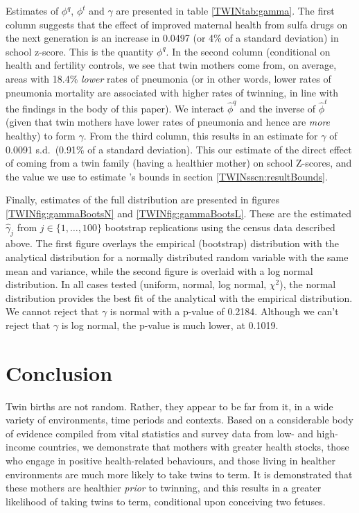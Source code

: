 \documentclass[subeqn]{article}
\begin{document}
\begin{spacing}{1.4}
Estimates of $\phi^q$, $\phi^t$ and $\gamma$ are presented in table
\ref{TWINtab:gamma}.  The first column suggests that the effect of improved
maternal health from sulfa drugs on the next generation is an increase
in 0.0497 (or 4\% of a standard deviation) in school z-score.  This is the
quantity $\phi^q$.  In the second column (conditional on health and fertility
controls, we see that twin mothers come from, on average, areas with 18.4\%
\emph{lower} rates of pneumonia (or in other words, lower rates of pneumonia
mortality are associated with higher rates of twinning, in line with the
findings in the body of this paper).  We interact $\hat\phi^q$ and the inverse
of $\hat\phi^t$ (given that twin mothers have lower rates of pneumonia and
hence are \emph{more} healthy) to form $\gamma$.  From the third column, this
results in an estimate for $\gamma$ of 0.0091 s.d.\ (0.91\% of a standard
deviation).  This our estimate of the direct effect of coming from a twin
family (having a healthier mother) on school Z-scores, and the value we use
to estimate \citet{Conleyetal2012}'s bounds in section
\ref{TWINsscn:resultBounds}.

Finally, estimates of the full distribution are presented in figures
\ref{TWINfig:gammaBootsN} and \ref{TWINfig:gammaBootsL}.  These are
the estimated $\hat\gamma_j$ from $j \in \{1,\ldots,100\}$ bootstrap
replications using the census data described above.  The first figure
overlays the empirical (bootstrap) distribution with the analytical
distribution for a normally distributed random variable with the same mean
and variance, while the second figure is overlaid with a log normal
distribution.  In all cases tested (uniform, normal, log normal, $\chi^2$),
the normal distribution provides the best fit of the analytical with the
empirical distribution. We cannot reject that $\gamma$ is normal with a
p-value of 0.2184.  Although we can't reject that $\gamma$ is log normal,
the p-value is much lower, at 0.1019.



\section{Conclusion}                               \label{TWINscn:conclusion}
Twin births are not random.  Rather, they appear to be far from it, in a wide
variety of environments, time periods and contexts.  Based on a considerable 
body of evidence compiled from vital statistics and survey data from low- and 
high-income countries, we demonstrate that mothers with greater health stocks,
those who engage in positive health-related behaviours, and those living in 
healther environments are much more likely to take twins to term.  It is 
demonstrated that these mothers are healthier \emph{prior} to twinning, and
this results in a greater likelihood of taking twins to term, conditional upon
conceiving two fetuses.


\end{spacing}
\end{document}
